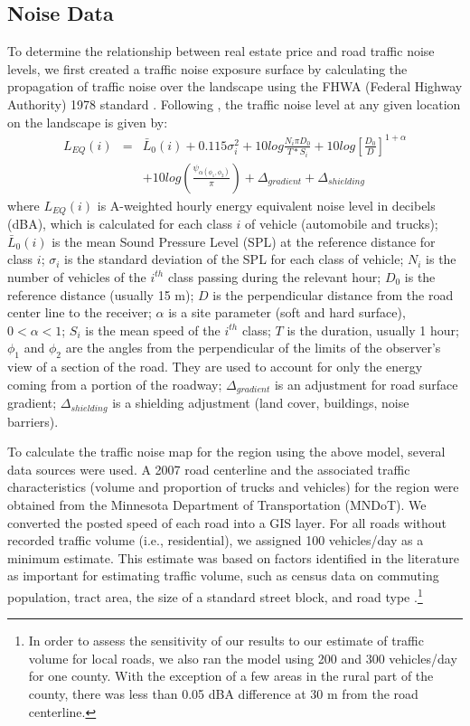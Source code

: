 \documentclass{article}\usepackage{graphicx, color}
\begin{document}
\subsection{Noise Data}
To determine the relationship between real estate price and road traffic noise levels, we first created a traffic noise exposure surface by calculating the propagation of traffic noise over the landscape using the FHWA (Federal Highway Authority) 1978 standard \citep{Barry1978}. Following \citet{Barry1978}, the traffic noise level at any given location on the landscape is given by: 
\begin{eqnarray}\label{eq:noise}
L_{EQ}(i) &=& \bar{L}_0(i) + 0.115 \sigma _i^2 + 10 log \frac{N_i \pi D_0}{T*S_i} + 10 log \left[ \frac{D_0}{D}\right]^{1 + \alpha}  \nonumber \\
&& + 10 log \left( \frac{\psi _{\alpha (\phi _1, \phi _2)}}{\pi}\right) + \Delta _{gradient} + \Delta _{shielding}
\end{eqnarray}
where $L_{EQ}(i)$ is A-weighted hourly energy equivalent noise level in decibels (dBA), which is calculated for each class $i$ of vehicle (automobile and trucks); $\bar{L}_0(i)$ is the mean Sound Pressure Level (SPL) at the reference distance for class $i$; $\sigma _i$ is the standard deviation of the SPL for each class of vehicle; $N_i$ is the number of vehicles of the $i^{th}$ class passing during the relevant hour; $D_0$ is the reference distance (usually 15 m); $D$ is the perpendicular distance from the road center line to the receiver; $\alpha$ is a site parameter (soft and hard surface), $0 < \alpha < 1$; $S_i$ is the mean speed of the $i^{th}$ class; $T$ is the duration, usually 1 hour; $\phi _1$ and $\phi _2$ are the angles from the perpendicular of the limits of the observer's view of a section of the road. They are used to account for only the energy coming from a portion of the roadway; $\Delta _{gradient}$ is an adjustment for road surface gradient; $\Delta _{shielding}$ is a shielding adjustment (land cover, buildings, noise barriers).

To calculate the traffic noise map for the region using the above model, several data sources were used. A 2007 road centerline and the associated traffic characteristics (volume and proportion of trucks and vehicles) for the region were obtained from the Minnesota Department of Transportation (MNDoT). We converted the posted speed of each road into a GIS layer. For all roads without recorded traffic volume (i.e., residential), we assigned 100 vehicles/day as a minimum estimate. This estimate was based on factors identified in the literature as important for estimating traffic volume, such as census data on commuting population, tract area, the size of a standard street block, and road type \citep{Cheng1992, Fricker1986}.\footnote{In order to assess the sensitivity of our results to our estimate of traffic volume for local roads, we also ran the model using 200 and 300 vehicles/day for one county. With the exception of a few areas in the rural part of the county, there was less than 0.05 dBA difference at 30 m from the road centerline.}
\end{document}
